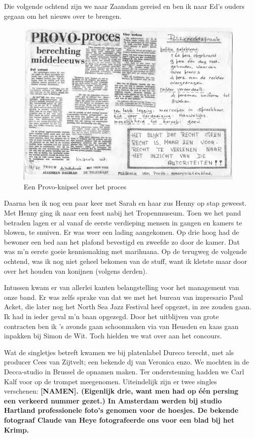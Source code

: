 \documentclass[10pt,twoside, openright]{memoir}
\begin{document}
Die volgende ochtend zijn we naar Zaandam gereisd en ben ik naar Ed’s ouders gegaan om het nieuws over te brengen. 


\begin{figure}
\includegraphics[width=\textwidth]{img/ch27/aug65EdE}
\caption*{\footnotesize Een Provo-knipsel over het proces}
\end{figure}

Daarna ben ik nog een paar keer met Sarah en haar zus Henny op stap geweest. Met Henny ging ik naar een feest nabij het Tropenmuseum. Toen we het pand betraden lagen er al vanaf de eerste verdieping mensen in gangen en kamers te blowen, te snuiven. Er was weer een lading aangekomen. Op drie hoog had de bewoner een bed aan het plafond bevestigd en zweefde zo door de kamer. Dat was m’n eerste goeie kennismaking met marihuana. Op de terugweg de volgende ochtend, was ik nog niet geheel bekomen van de stuff, want ik kletste maar door over het houden van konijnen (volgens derden).

Intussen kwam er van allerlei kanten belangstelling voor het management van onze band. Er was zelfs sprake van dat we met het bureau van impresario Paul Acket, die later nog het North Sea Jazz Festival heef opgezet, in zee zouden gaan. Ik had in ieder geval m’n baan opgezegd. Door het uitblijven van grote contracten ben ik ’s avonds gaan schoonmaken via van Heusden en kaas gaan inpakken bij Simon de Wit. Toch hielden we wat over aan het concours.

Wat de singletjes betreft kwamen we bij platenlabel Dureco terecht, met als producer Cees van Zijtvelt; een bekende dj van Veronica enzo. We mochten in de Decca-studio in Brussel de opnamen maken. Ter ondersteuning hadden we Carl Kalf voor op de trompet meegenomen. Uiteindelijk zijn er twee singles verschenen: \bf{[NAMEN]}. (Eigenlijk drie, want men had op één persing een verkeerd nummer gezet.) In Amsterdam werden bij studio Hartland professionele foto’s genomen voor de hoesjes. De bekende fotograaf Claude van Heye fotografeerde ons voor een blad bij het Krimp.
\end{document}

